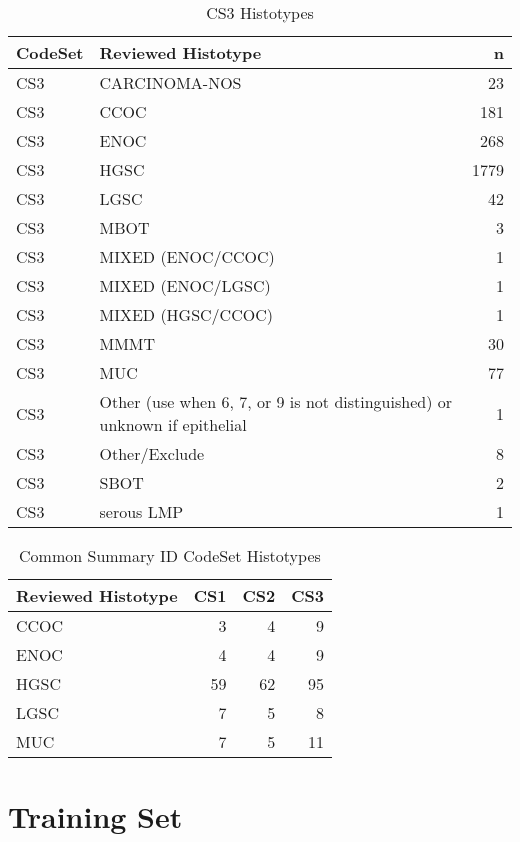 \documentclass[
]{report}
\begin{document}
\begin{table}

\caption{\label{tab:dist-cs3}CS3 Histotypes}
\centering
\begin{tabular}[t]{l|l|r}
\hline
CodeSet & Reviewed Histotype & n\\
\hline
CS3 & CARCINOMA-NOS & 23\\
\hline
CS3 & CCOC & 181\\
\hline
CS3 & ENOC & 268\\
\hline
CS3 & HGSC & 1779\\
\hline
CS3 & LGSC & 42\\
\hline
CS3 & MBOT & 3\\
\hline
CS3 & MIXED (ENOC/CCOC) & 1\\
\hline
CS3 & MIXED (ENOC/LGSC) & 1\\
\hline
CS3 & MIXED (HGSC/CCOC) & 1\\
\hline
CS3 & MMMT & 30\\
\hline
CS3 & MUC & 77\\
\hline
CS3 & Other (use when 6, 7, or 9 is not distinguished) or unknown if epithelial & 1\\
\hline
CS3 & Other/Exclude & 8\\
\hline
CS3 & SBOT & 2\\
\hline
CS3 & serous LMP & 1\\
\hline
\end{tabular}
\end{table}

\begin{table}

\caption{\label{tab:dist-common}Common Summary ID CodeSet Histotypes}
\centering
\begin{tabular}[t]{l|r|r|r}
\hline
Reviewed Histotype & CS1 & CS2 & CS3\\
\hline
CCOC & 3 & 4 & 9\\
\hline
ENOC & 4 & 4 & 9\\
\hline
HGSC & 59 & 62 & 95\\
\hline
LGSC & 7 & 5 & 8\\
\hline
MUC & 7 & 5 & 11\\
\hline
\end{tabular}
\end{table}

\hypertarget{training-set}{%
\section{Training Set}\label{training-set}}
\end{document}

